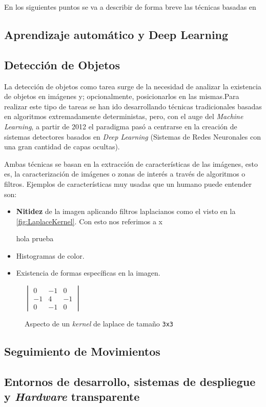 En los siguientes puntos se va a describir de forma breve las técnicas basadas en 

\subsection{Aprendizaje automático y Deep Learning}



\subsection{Detección de Objetos}

La detección de objetos como tarea surge de la necesidad de analizar la existencia de objetos en imágenes y; opcionalmente, posicionarlos en las mismas.Para realizar este tipo de tareas se han ido 
desarrollando técnicas tradicionales basadas en algoritmos extremadamente deterministas, pero, con el auge del \textit{Machine Learning}, a partir de 2012\cite{zouObjectDetection202023} 
el paradigma pasó a centrarse en la creación de sistemas detectores basados en \textit{Deep Learning} (Sistemas de Redes Neuronales con una gran cantidad de capas ocultas).

Ambas técnicas se basan en la extracción de características de las imágenes, esto es, la caracterización de imágenes o zonas de interés a través de algoritmos o filtros. Ejemplos de características 
muy usadas que un humano puede entender son:\begin{itemize}
    \item \textbf{Nitidez} de la imagen aplicando filtros laplacianos como el visto en la \autoref{fig:LaplaceKernel}.
    Con esto nos referimos a x

    hola prueba
    \item Histogramas de color.
    \item Existencia de formas específicas en la imagen.
\end{itemize}

\begin{figure}[H]
    \centering
    \(
    \begin{vmatrix}
        0 & -1 & 0 \\
        -1 & 4 & -1 \\
        0 & -1 & 0
    \end{vmatrix}
    \)
    \caption{Aspecto de un \textit{kernel} de laplace de tamaño \texttt{3x3}}
    \label{fig:LaplaceKernel}
\end{figure}


\subsection{Seguimiento de Movimientos}

\subsection{Entornos de desarrollo, sistemas de despliegue y \textit{Hardware} transparente}
